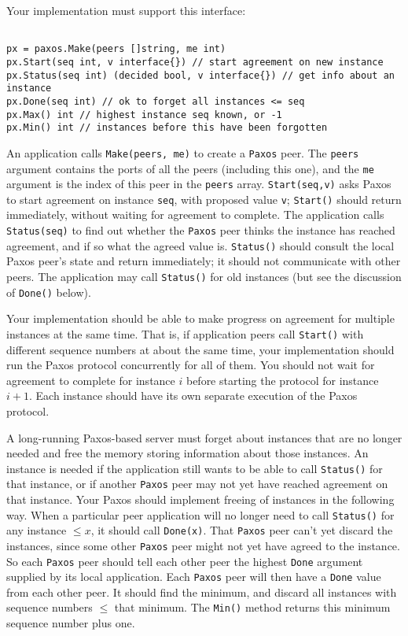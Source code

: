 \documentclass{article}
\newcommand{\code}{\texttt}
\begin{document}
Your implementation must support this interface:

\newpage
\begin{lstlisting}

px = paxos.Make(peers []string, me int)
px.Start(seq int, v interface{}) // start agreement on new instance
px.Status(seq int) (decided bool, v interface{}) // get info about an instance
px.Done(seq int) // ok to forget all instances <= seq
px.Max() int // highest instance seq known, or -1
px.Min() int // instances before this have been forgotten
\end{lstlisting}

An application calls \code{Make(peers, me)} to create a \code{Paxos} peer. The \code{peers}
argument contains the ports of all the peers (including this one), and the
\code{me} argument is the index of this peer in the \code{peers} array. \code{Start(seq,v)}
asks Paxos to start agreement on instance \code{seq}, with proposed value \code{v};
\code{Start()} should return immediately, without waiting for agreement to
complete. The application calls \code{Status(seq)} to find out whether the
\code{Paxos} peer thinks the instance has reached agreement, and if so what
the agreed value is. \code{Status()} should consult the local Paxos peer's state
and return immediately; it should not communicate with other peers.
The application may call \code{Status()} for old instances (but see the
discussion of \code{Done()} below).

Your implementation should be able to make progress on agreement for
multiple instances at the same time. That is, if application peers call
\code{Start()} with different sequence numbers at about the same time, your
implementation should run the Paxos protocol concurrently for all of
them. You should not wait for agreement to complete for instance $i$
before starting the protocol for instance $i+1$. Each instance should have
its own separate execution of the Paxos protocol.

A long-running Paxos-based server must forget about instances that are
no longer needed and free the memory storing information about those
instances. An instance is needed if the application still wants to be able
to call \code{Status()} for that instance, or if another \code{Paxos} peer may not yet
have reached agreement on that instance. Your Paxos should
implement freeing of instances in the following way. When a particular
peer application will no longer need to call \code{Status()} for any instance $\le
x$, it should call \code{Done(x)}. That \code{Paxos} peer can't yet discard the
instances, since some other \code{Paxos} peer might not yet have agreed to
the instance. So each \code{Paxos} peer should tell each other peer the
highest \code{Done} argument supplied by its local application. Each \code{Paxos}
peer will then have a \code{Done} value from each other peer. It should find the
minimum, and discard all instances with sequence numbers $\le$ that
minimum. The \code{Min()} method returns this minimum sequence number
plus one.
\end{document}
